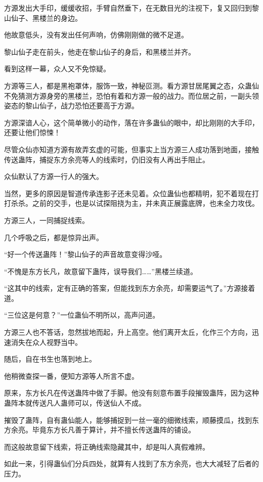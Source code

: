 \begin{this_body}
方源发出大手印，缓缓收招，手臂自然垂下，在无数目光的注视下，复又回归到黎山仙子、黑楼兰的身边。

他故意低头，没有发出任何声响，仿佛刚刚做的微不足道。

黎山仙子走在前头，他走在黎山仙子的身后，和黑楼兰并齐。

看到这样一幕，众人又不免惊疑。

方源等三人，都是黑袍罩体，服饰一致，神秘叵测。看方源甘居尾翼之态，众蛊仙不免猜测方源身旁的黑楼兰，恐怕有着和方源一般的战力。而位居之前，一副头领姿态的黎山仙子，战力恐怕还要高于方源。

方源深谙人心，这个简单微小的动作，落在许多蛊仙的眼中，却比刚刚的大手印，还要让他们惊悚！

尽管众仙亦知道方源有故弄玄虚的可能，但事实上当方源三人成功落到地面，接触传送蛊阵，捕捉东方余亮等人的线索时，仍旧没有人再出手阻止。

众仙默认了方源一行人的强大。

当然，更多的原因是智道传承连影子还未见着。众位蛊仙也都精明，犯不着现在打打杀杀。之前的交手，也是以试探阻挠为主，并未真正展露底牌，也未全力攻伐。

方源三人，一同捕捉线索。

几个呼吸之后，都是惊异出声。

“好一个传送蛊阵！”黎山仙子的声音故意变得沙哑。

“不愧是东方长凡，故意留下蛊阵，误导我们……”黑楼兰续道。

“这其中的线索，定有正确的答案，但能找到东方余亮，却需要运气了。”方源接着道。

“三位这是何意？”一位蛊仙不明所以，高声问道。

方源三人也不答话，忽然拔地而起，升上高空。他们离开太丘，化作三个方向，迅速消失在众人视野当中。

随后，自在书生也落到地上。

他稍微查探一番，便知方源等人所言不虚。

原来，东方长凡在传送蛊阵中做了手脚。他没有刻意布置手段摧毁蛊阵，因为这种蛊阵本就传送凡人蛊师可以，传送仙人不成。

摧毁了蛊阵，自有蛊仙能人，能够捕捉到一丝一毫的细微线索，顺藤摸瓜，找到东方余亮。毕竟东方长凡善于算计，并不擅长传送蛊阵的铺设。

而这般故意留下线索，将正确线索隐藏其中，却是叫人真假难辨。

如此一来，引得蛊仙们分兵四处，就算有人找到了东方余亮，也大大减轻了后者的压力。


\end{this_body}
